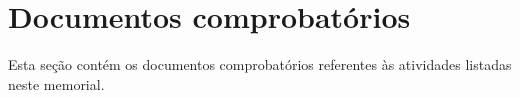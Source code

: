 \documentclass[a4paper,oneside,12pt]{article}
\newcounter{document}%
\begin{document}
\clearpage
\appendix
\newpage
\section{Documentos comprobatórios}
Esta seção contém os documentos comprobatórios referentes às atividades listadas neste memorial.
\renewcommand{\thesubsection}{\arabic{subsection}}


\end{document}
